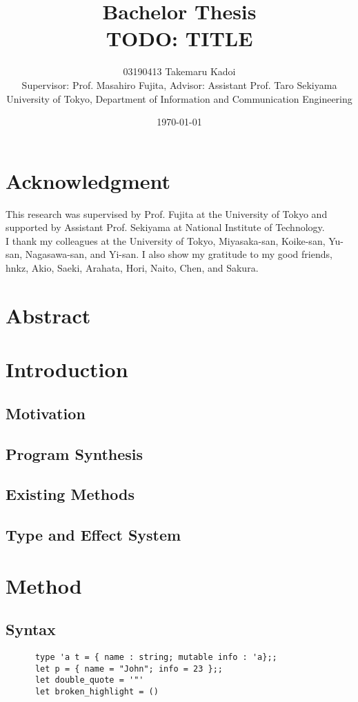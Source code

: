 \documentclass[12pt, a4paper, titlepage]{report}
\title{Bachelor Thesis \\ TODO: TITLE}
\author{
  03190413 Takemaru Kadoi
  \\[1cm]
  {\small Supervisor: Prof. Masahiro Fujita},
  {\small Advisor: Assistant Prof. Taro Sekiyama}
  \\[1cm]
  {\small University of Tokyo, Department of Information and Communication Engineering}
}
\date{\today}
\begin{document}
\maketitle
\newpage
\tableofcontents
\newpage

\chapter*{Acknowledgment}
This research was supervised by Prof. Fujita at the University of Tokyo and supported by Assistant Prof. Sekiyama at National Institute of Technology. \\
I thank my colleagues at the University of Tokyo, Miyasaka-san, Koike-san, Yu-san, Nagasawa-san, and Yi-san.
I also show my gratitude to my good friends, hnkz, Akio, Saeki, Arahata, Hori, Naito, Chen, and Sakura.

\chapter{Abstract} %

\chapter{Introduction}
  \section{Motivation}
  \section{Program Synthesis}
    \cite{gulwani2017program}
  \section{Existing Methods}
  \section{Type and Effect System}

\chapter{Method} %
  \section{Syntax}
    \begin{verbatim}
      type 'a t = { name : string; mutable info : 'a};;
      let p = { name = "John"; info = 23 };;
      let double_quote = '"'
      let broken_highlight = ()
    \end{verbatim}
\end{document}
